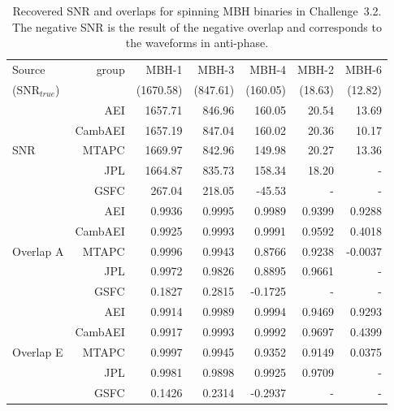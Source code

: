 \documentclass{iopart}
\begin{document}
\begin{table}
\begin{center}
\begin{tabular}{lr|rrrrr}
\hline
Source                              & group &  MBH-1      & MBH-3   & MBH-4    & MBH-2 & MBH-6   \\
($\textrm{SNR}_{true}$) &              & (1670.58) & (847.61) & (160.05) & (18.63) & (12.82) \\
\hline
                      & AEI            & 1657.71 & 846.96 & 160.05 & 20.54 & 13.69 \\
                      & CambAEI & 1657.19 & 847.04 & 160.02 & 20.36 & 10.17 \\
SNR             & MTAPC    & 1669.97 & 842.96 & 149.98 & 20.27 & 13.36\\
                      & JPL           & 1664.87 & 835.73 & 158.34 & 18.20 & - \\
                      & GSFC       &   267.04 & 218.05 &  -45.53 & - & - \\
\hline
                      & AEI            & 0.9936 & 0.9995 &  0.9989 & 0.9399 &  0.9288 \\
                      & CambAEI & 0.9925 & 0.9993 &  0.9991 & 0.9592 &  0.4018 \\
Overlap A    & MTAPC    & 0.9996 & 0.9943 &  0.8766 & 0.9238 & -0.0037 \\
                      & JPL           & 0.9972 & 0.9826 &  0.8895 & 0.9661 & - \\
                      & GSFC       & 0.1827 & 0.2815 & -0.1725 & - & - \\
\hline
                      & AEI            & 0.9914 & 0.9989 &  0.9994 & 0.9469 &  0.9293 \\
                      & CambAEI & 0.9917 & 0.9993 &  0.9992 & 0.9697 &  0.4399 \\
Overlap E    & MTAPC    & 0.9997 & 0.9945 &  0.9352 & 0.9149 &  0.0375\\
                      & JPL           & 0.9981 & 0.9898 &  0.9925 & 0.9709 & - \\
                      & GSFC       & 0.1426 & 0.2314 & -0.2937 & - & - \\
\hline
\end{tabular}
\end{center}
\caption{ Recovered SNR and overlaps for spinning MBH binaries in Challenge~3.2. The negative
SNR is the result of the negative overlap and corresponds to  the waveforms in anti-phase.
\label{tab:SMBH_SNR}}
\end{table} 
\end{document}
